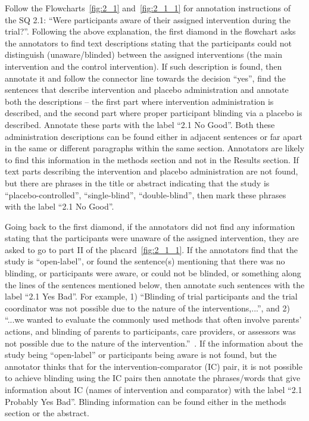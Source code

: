 \documentclass[sn-mathphys,Numbered]{sn-jnl}%
\begin{document}
Follow the Flowcharts~\ref{fig:2_1} and~\ref{fig:2_1_1} for annotation instructions of the SQ 2.1: ``Were participants aware of their assigned intervention during the trial?''.
Following the above explanation, the first diamond in the flowchart asks the annotators to find text descriptions stating that the participants could not distinguish (unaware/blinded) between the assigned interventions (the main intervention and the control intervention).
If such description is found, then annotate it and follow the connector line towards the decision ``yes'', find the sentences that describe intervention and placebo administration and annotate both the descriptions – the first part where intervention administration is described, and the second part where proper participant blinding via a placebo is described.
Annotate these parts with the label ``2.1 No Good''.
Both these administration descriptions can be found either in adjacent sentences or far apart in the same or different paragraphs within the same section.
Annotators are likely to find this information in the methods section and not in the Results section. 
If text parts describing the intervention and placebo administration are not found, but there are phrases in the title or abstract indicating that the study is ``placebo-controlled'', ``single-blind'', ``double-blind'', then mark these phrases with the label ``2.1 No Good''.


Going back to the first diamond, if the annotators did not find any information stating that the participants were unaware of the assigned intervention, they are asked to go to part II of the placard~\ref{fig:2_1_1}.
If the annotators find that the study is ``open-label'', or found the sentence(s) mentioning that there was no blinding, or participants were aware, or could not be blinded, or something along the lines of the sentences mentioned below, then annotate such sentences with the label ``2.1 Yes Bad''.
For example, 1) ``Blinding of trial participants and the trial coordinator was not possible due to the nature of the interventions,...'', and 2) ``...we wanted to evaluate the commonly used methods that often involve parents’ actions, and blinding of parents to participants, care providers, or assessors was not possible due to the nature of the intervention.''~\cite{buttery2023lung,andersson2020effect}.
If the information about the study being ``open-label'' or participants being aware is not found, but the annotator thinks that for the intervention-comparator (IC) pair, it is not possible to achieve blinding using the IC pairs then annotate the phrases/words that give information about IC (names of intervention and comparator) with the label ``2.1 Probably Yes Bad''.
Blinding information can be found either in the methods section or the abstract.
%
%
%
\end{document}
